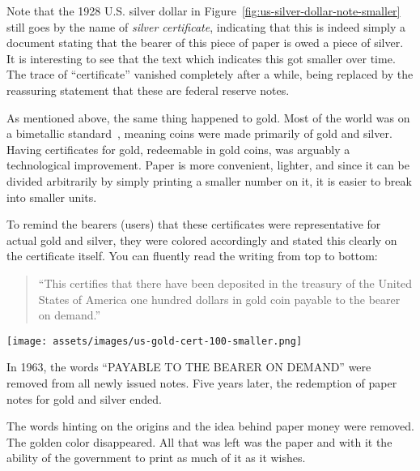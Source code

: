 Note that the 1928 U.S. silver dollar in
Figure~\ref{fig:us-silver-dollar-note-smaller} still goes by the name of
\textit{silver certificate}, indicating that this is indeed simply a document
stating that the bearer of this piece of paper is owed a piece of silver. It is
interesting to see that the text which indicates this got smaller over time. The
trace of \enquote{certificate} vanished completely after a while, being replaced
by the reassuring statement that these are federal reserve notes.

As mentioned above, the same thing happened to gold. Most of the world was on a
bimetallic standard~\cite{wiki:bimetallism}, meaning coins were made
primarily of gold and silver. Having certificates for gold, redeemable in gold
coins, was arguably a technological improvement. Paper is more convenient,
lighter, and since it can be divided arbitrarily by simply printing a smaller
number on it, it is easier to break into smaller units.

To remind the bearers (users) that these certificates were
representative for actual gold and silver, they were colored accordingly
and stated this clearly on the certificate itself. You can fluently read
the writing from top to bottom:

\begin{quotation}\begin{samepage}
\enquote{This certifies that there have been deposited in the treasury of the
United States of America one hundred dollars in gold coin payable to
the bearer on demand.}
\end{samepage}\end{quotation}

\begin{center}
  \centering
  \texttt{[image: assets/images/us-gold-cert-100-smaller.png]}
  \label{fig:us-gold-cert-100-smaller}
\end{center}

In 1963, the words \enquote{PAYABLE TO THE BEARER ON DEMAND} were removed from
all newly issued notes. Five years later, the redemption of paper notes
for gold and silver ended.

The words hinting on the origins and the idea behind paper money were
removed. The golden color disappeared. All that was left was the paper
and with it the ability of the government to print as much of it as it
wishes.

